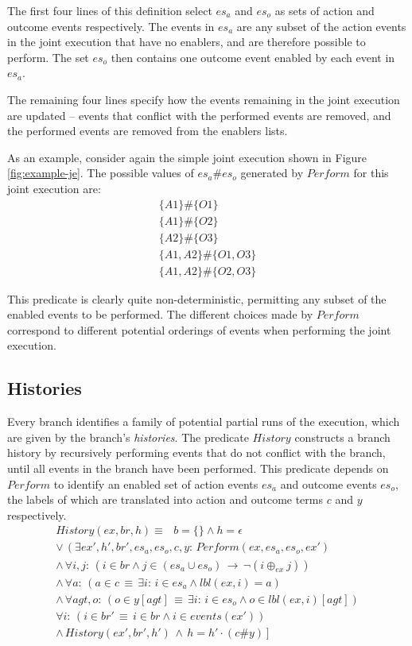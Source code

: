 The first four lines of this definition select $es_{a}$ and $es_{o}$
as sets of action and outcome events respectively. The events in $es_{a}$
are any subset of the action events in the joint execution that have
no enablers, and are therefore possible to perform. The set $es_{o}$
then contains one outcome event enabled by each event in $es_{a}$.

The remaining four lines specify how the events remaining in the joint
execution are updated -- events that conflict with the performed events
are removed, and the performed events are removed from the enablers
lists.

As an example, consider again the simple joint execution shown in
Figure \ref{fig:example-je}. The possible values of $es_{a}\#es_{o}$
generated by $Perform$ for this joint execution are:\begin{gather*}
\{A1\}\#\{O1\}\\
\{A1\}\#\{O2\}\\
\{A2\}\#\{O3\}\\
\{A1,A2\}\#\{O1,O3\}\\
\{A1,A2\}\#\{O2,O3\}\end{gather*}


This predicate is clearly quite non-deterministic, permitting any
subset of the enabled events to be performed. The different choices
made by $Perform$ correspond to different potential orderings of
events when performing the joint execution.


\subsection{Histories}

Every branch identifies a family of potential partial runs of the
execution, which are given by the branch's \emph{histories}. The predicate
$History$ constructs a branch history by recursively performing events
that do not conflict with the branch, until all events in the branch
have been performed. This predicate depends on $Perform$ to identify
an enabled set of action events $es_{a}$ and outcome events $es_{o}$,
the labels of which are translated into action and outcome terms $c$
and $y$ respectively. \begin{gather*}
History(ex,br,h)\equiv\,\,\,\, b=\{\}\wedge h=\epsilon\\
\vee\,\left(\exists ex',h',br',es_{a},es_{o},c,y:\, Perform(ex,es_{a},es_{o},ex')\right.\\
\wedge\,\forall i,j:\,\left(i\in br\wedge j\in(es_{a}\cup es_{o})\,\rightarrow\,\neg(i\oplus_{ex}j)\right)\\
\wedge\,\forall a:\,\left(a\in c\,\equiv\,\exists i:\, i\in es_{a}\wedge lbl(ex,i)=a\right)\\
\wedge\,\forall agt,o:\,\left(o\in y[agt]\,\equiv\,\exists i:\, i\in es_{o}\wedge o\in lbl(ex,i)[agt]\right)\\
\forall i:\,\left(i\in br'\,\equiv\, i\in br\wedge i\in events(ex')\right)\\
\left.\wedge\, History(ex',br',h')\,\wedge\, h=h'\cdot(c\#y)\right]\end{gather*}


